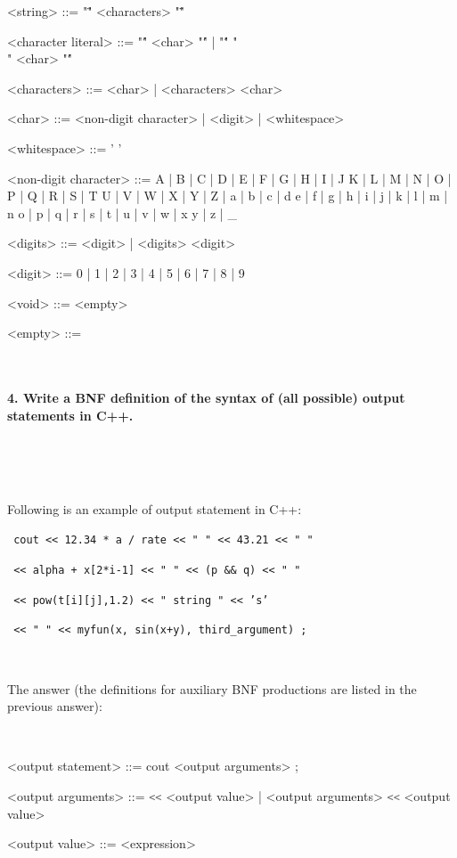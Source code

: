 \documentclass{article}
\begin{document}
\begin{grammar}
		<string> ::= "\"" <characters> "\""
		
		<character literal> ::= "\'" <char> "\'" | "\'" "\\" <char> "\'"

		<characters> ::= <char> | <characters> <char>
		
		<char> ::= <non-digit character> | <digit> | <whitespace>
		
		<whitespace> ::= ' '
		
		<non-digit character> ::= A | B | C | D | E | F | G | H | I | J
			  				 \alt K | L | M | N | O | P | Q | R | S | T 
			   			     \alt U | V | W | X | Y | Z | a | b | c | d 
			  				 \alt e | f | g | h | i | j | k | l | m | n
			   				 \alt o | p | q | r | s | t | u | v | w | x 
			  				 \alt y | z | _
		
		<digits> ::= <digit> | <digits> <digit>
		
		<digit> ::= 0 | 1 | 2 | 3 | 4 | 5 | 6 | 7 | 8 | 9
		
		<void> ::= <empty>
		
		<empty> ::= \

	\end{grammar}
	

	
	
	\rmfamily\
	
	\paragraph{4. Write a BNF definition of the syntax of (all possible) output statements in C++. }\
	
	\rmfamily\

	
		Following is an example of output statement in C++:
		\newline

	
		\texttt{ cout << 12.34 * a / rate << " " << 43.21 << " " }
		
		\texttt{ 	  << alpha + x[2*i-1] << " " << (p \&\& q) << " " }
		
		\texttt{      << pow(t[i][j],1.2) << " string " << 's' }
		
		\texttt{      << " " << myfun(x, sin(x+y), third_argument) ; } 
		
		\rmfamily\
		
		
		The answer (the definitions for auxiliary BNF productions are listed in the previous answer):
		
	\ttfamily\
	\begin{grammar}
	
		<output statement> ::= cout <output arguments> ;
		
		<output arguments> ::= \lstinline[language=bash]/<</ <output value> | <output arguments> \lstinline[language=bash]/<</ <output value>
		
		<output value> 	   ::= <expression>
		
	\end{grammar}
	
\end{document}
